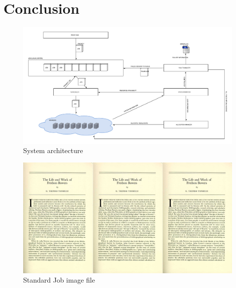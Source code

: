 \documentclass[a4paper]{IEEEtran}
\begin{document}
\section{Conclusion}

\begin{thebibliography}{9}

 
\end{thebibliography}


\newpage

\begin{landscape}
\appendix

\begin{figure}[h]
\centering
\includegraphics[width=700pt]{"System Architecture 2"}
\caption{System architecture}
\label{fig_sysarch}
\end{figure}
\end{landscape}
\clearpage

\begin{landscape}
\appendix

\begin{figure}[h]
\centering
\includegraphics[width=700pt]{standardfile}
\caption{Standard Job image file}
\label{fig_standardjob}
\end{figure}
\end{landscape}
\clearpage
\end{document}
